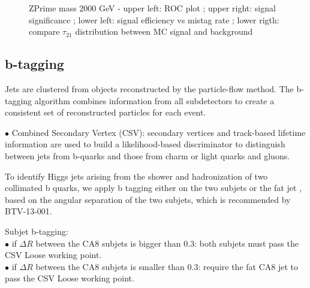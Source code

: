 \documentclass[12pt]{article} %
\begin{document}
\begin{figure}[H] %
  \caption{ZPrime mass 2000 GeV - upper left: ROC plot ; upper right: signal significance ; lower left: signal efficiency vs mistag rate ; lower rigth: compare $\tau_{21}$ distribution between MC signal and background}
  \label{fig:tau21_M2000}
\end{figure}



\subsection{b-tagging}

Jets are clustered from objects reconstructed by the particle-flow method. The b-tagging algorithm combines information from all subdetectors to create a consistent set of reconstructed particles for each event.

\noindent
$\bullet$ Combined Secondary Vertex (CSV): secondary vertices and track-based lifetime information are used to build a likelihood-based discriminator to distinguish between jets from b-quarks and those from charm or light quarks and gluons.

To identify Higgs jets arising from the shower and hadronization of two collimated b quarks, we apply b tagging either on the two subjets or the fat jet , based on the angular separation of the two subjets, which is recommended by BTV-13-001.

Subjet b-tagging:\\
\noindent
   $\bullet$ if $\Delta R$ between the CA8 subjets is bigger than 0.3: both subjets must pass the CSV Loose working point. \\
   $\bullet$ if $\Delta R$ between the CA8 subjets is smaller than 0.3: require the fat CA8 jet to pass the CSV Loose working point. \\
\end{document}
